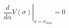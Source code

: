 \begin{equation}  \label{28}
\left.\frac{d}{d\alpha}V(\sigma)\right|_{\sigma=\sigma_{min}}=0
\end{equation}

